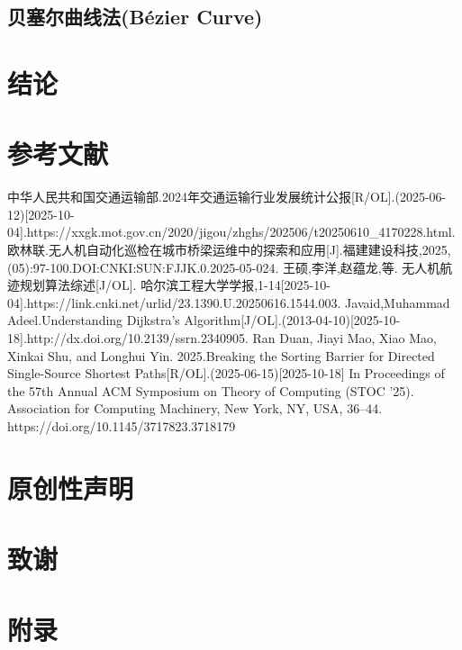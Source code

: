 \documentclass[12pt,a4paper,oneside,UTF8]{ctexart}
\begin{document}
\subsection{贝塞尔曲线法(Bézier Curve)}
\newpage\section{结论}
\newpage\section{参考文献}\begin{thebibliography}{20}
中华人民共和国交通运输部.2024年交通运输行业发展统计公报[R/OL].(2025-06-12)[2025-10-04].https://xxgk.mot.gov.cn/2020/jigou/zhghs/202506/t20250610\_4170228.html.
欧林联.无人机自动化巡检在城市桥梁运维中的探索和应用[J].福建建设科技,2025,(05):97-100.DOI:CNKI:SUN:FJJK.0.2025-05-024.
王硕,李洋,赵蕴龙,等. 无人机航迹规划算法综述[J/OL]. 哈尔滨工程大学学报,1-14[2025-10-04].https://link.cnki.net/urlid/23.1390.U.20250616.1544.003.
Javaid,Muhammad Adeel.Understanding Dijkstra's Algorithm[J/OL].(2013-04-10)[2025-10-18].http://dx.doi.org/10.2139/ssrn.2340905.
Ran Duan, Jiayi Mao, Xiao Mao, Xinkai Shu, and Longhui Yin. 2025.Breaking the Sorting Barrier for Directed Single-Source Shortest Paths[R/OL].(2025-06-15)[2025-10-18] In Proceedings of the 57th Annual ACM Symposium on Theory of Computing (STOC '25). Association for Computing Machinery, New York, NY, USA, 36–44. https://doi.org/10.1145/3717823.3718179
\end{thebibliography}
\newpage\section{原创性声明}
\newpage\section{致谢}
\newpage\section{附录}
\end{document}
